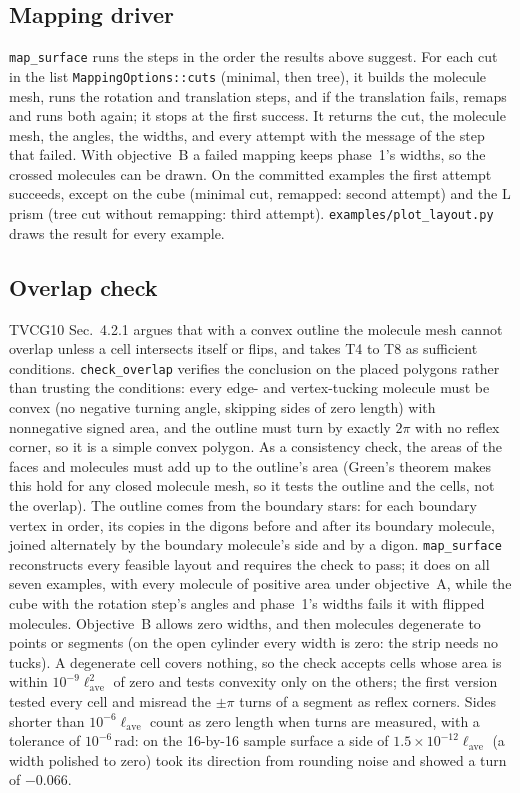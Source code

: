 \documentclass[11pt]{article}
\theoremstyle{definition}
\begin{document}
\subsection{Mapping driver}

\texttt{map\_surface} runs the steps in the order the results above suggest.
For each cut in the list \texttt{MappingOptions::cuts} (minimal, then tree),
it builds the molecule mesh, runs the rotation and translation steps, and if
the translation fails, remaps and runs both again; it stops at the first
success. It returns the
cut, the molecule mesh, the angles, the widths, and every attempt with the
message of the step that failed. With objective~B a failed mapping keeps
phase~1's widths, so the crossed molecules can be drawn. On the committed
examples the first attempt succeeds, except on the cube (minimal cut,
remapped: second attempt) and the L prism (tree cut without remapping: third
attempt). \texttt{examples/plot\_layout.py} draws the result for every
example.

\subsection{Overlap check}

TVCG10 Sec.~4.2.1 argues that with a convex outline the molecule mesh cannot
overlap unless a cell intersects itself or flips, and takes T4 to T8 as
sufficient conditions. \texttt{check\_overlap} verifies the conclusion on the
placed polygons rather than trusting the conditions: every edge- and
vertex-tucking molecule must be convex (no negative turning angle, skipping
sides of zero length) with nonnegative signed area, and the outline must turn
by exactly $2\pi$ with no reflex corner, so it is a simple convex polygon. As
a consistency check, the areas of the faces and molecules must add up to the
outline's area (Green's theorem makes this hold for any closed molecule mesh,
so it tests the outline and the cells, not the overlap). The outline comes
from the boundary stars: for each boundary vertex in order, its copies in the
digons before and after its boundary molecule, joined alternately by the
boundary molecule's side and by a digon. \texttt{map\_surface} reconstructs
every feasible layout and requires the check to pass; it does on all seven
examples, with every molecule of positive area under objective~A, while the
cube with the rotation step's angles and phase~1's widths fails it with
flipped molecules. Objective~B allows zero widths, and then molecules
degenerate to points or segments (on the open cylinder every width is zero:
the strip needs no tucks). A degenerate cell covers nothing, so the check
accepts cells whose area is within $10^{-9}\ell_{\mathrm{ave}}^2$ of zero and
tests convexity only on the others; the first version tested every cell and
misread the $\pm\pi$ turns of a segment as reflex corners. Sides shorter than
$10^{-6}\ell_{\mathrm{ave}}$ count as zero length when turns are measured,
with a tolerance of $10^{-6}$\,rad: on the 16-by-16 sample surface a side of
$1.5\times10^{-12}\ell_{\mathrm{ave}}$ (a width polished to zero) took its
direction from rounding noise and showed a turn of $-0.066$.
\end{document}
